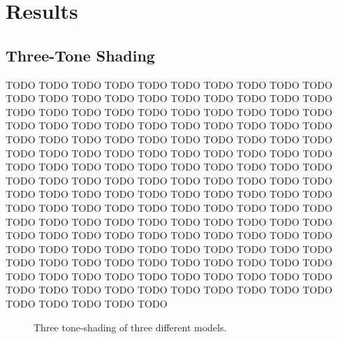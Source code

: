 \section{Results}

  \subsection{Three-Tone Shading}

      TODO TODO TODO TODO TODO TODO TODO TODO TODO TODO TODO TODO TODO TODO TODO
      TODO TODO TODO TODO TODO TODO TODO TODO TODO TODO TODO TODO TODO TODO TODO
      TODO TODO TODO TODO TODO TODO TODO TODO TODO TODO TODO TODO TODO TODO TODO
      TODO TODO TODO TODO TODO TODO TODO TODO TODO TODO TODO TODO TODO TODO TODO
      TODO TODO TODO TODO TODO TODO TODO TODO TODO TODO TODO TODO TODO TODO TODO
      TODO TODO TODO TODO TODO TODO TODO TODO TODO TODO TODO TODO TODO TODO TODO
      TODO TODO TODO TODO TODO TODO TODO TODO TODO TODO TODO TODO TODO TODO TODO
      TODO TODO TODO TODO TODO TODO TODO TODO TODO TODO TODO TODO TODO TODO TODO
      TODO TODO TODO TODO TODO TODO TODO TODO TODO TODO TODO TODO TODO TODO TODO
      TODO TODO TODO TODO TODO TODO TODO TODO TODO TODO TODO TODO TODO TODO TODO
      TODO TODO TODO TODO TODO TODO TODO TODO TODO TODO TODO TODO TODO TODO TODO

    \begin{figure}
      \centering



      \caption{Three tone-shading of three different models.}
      \label{three-tone}
    \end{figure}

